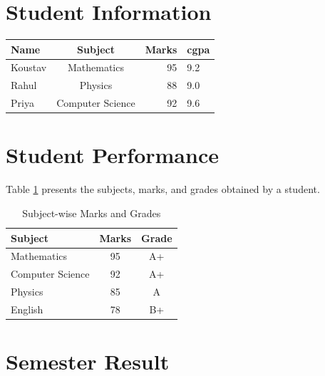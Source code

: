 \documentclass{article}
\begin{document}
		\section{Student Information}
	
	\begin{tabular}{|l|c|r|l|}
		\hline
		Name & Subject & Marks&cgpa \\
		\hline
		Koustav & Mathematics & 95&9.2 \\
		\hline
		Rahul & Physics & 88 &9.0 \\
		\hline
		Priya & Computer Science & 92&9.6 \\
		\hline
	\end{tabular}
	\section{Student Performance}
	
	Table \ref{tab:marks} presents the subjects, marks, and grades
	obtained by a student.
	
	\begin{table}[t]
		\centering
		
		\caption{Subject-wise Marks and Grades}
		\label{tab:marks}
		
		\begin{tabular}{lcc}
			\toprule
			Subject & Marks & Grade \\
			\midrule
			Mathematics & 95 & A+ \\
			Computer Science & 92 & A+ \\
			Physics & 85 & A \\
			English & 78 & B+ \\
			\bottomrule
		\end{tabular}
		
	\end{table}

	\section{Semester Result}
	
\end{document}
